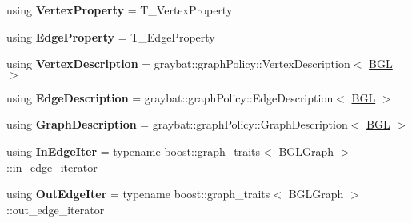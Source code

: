\begin{DoxyCompactItemize}
\item 
\hypertarget{classgraybat_1_1graphPolicy_1_1BGL_a265ad5af8b806b224bb7279bda3193c7}{}using {\bfseries Vertex\+Property} = T\+\_\+\+Vertex\+Property\label{classgraybat_1_1graphPolicy_1_1BGL_a265ad5af8b806b224bb7279bda3193c7}

\item 
\hypertarget{classgraybat_1_1graphPolicy_1_1BGL_ab914ee8a3223cc86c73af3046bf417cf}{}using {\bfseries Edge\+Property} = T\+\_\+\+Edge\+Property\label{classgraybat_1_1graphPolicy_1_1BGL_ab914ee8a3223cc86c73af3046bf417cf}

\item 
\hypertarget{classgraybat_1_1graphPolicy_1_1BGL_ae9fc60048660948bfc2418ed74cd3882}{}using {\bfseries Vertex\+Description} = graybat\+::graph\+Policy\+::\+Vertex\+Description$<$ \hyperlink{classgraybat_1_1graphPolicy_1_1BGL}{B\+G\+L} $>$\label{classgraybat_1_1graphPolicy_1_1BGL_ae9fc60048660948bfc2418ed74cd3882}

\item 
\hypertarget{classgraybat_1_1graphPolicy_1_1BGL_a72d9bad73b4ba1021b384379638b8e1e}{}using {\bfseries Edge\+Description} = graybat\+::graph\+Policy\+::\+Edge\+Description$<$ \hyperlink{classgraybat_1_1graphPolicy_1_1BGL}{B\+G\+L} $>$\label{classgraybat_1_1graphPolicy_1_1BGL_a72d9bad73b4ba1021b384379638b8e1e}

\item 
\hypertarget{classgraybat_1_1graphPolicy_1_1BGL_ab58617e8a5ce35716fa72c6c8ecee583}{}using {\bfseries Graph\+Description} = graybat\+::graph\+Policy\+::\+Graph\+Description$<$ \hyperlink{classgraybat_1_1graphPolicy_1_1BGL}{B\+G\+L} $>$\label{classgraybat_1_1graphPolicy_1_1BGL_ab58617e8a5ce35716fa72c6c8ecee583}

\item 
\hypertarget{classgraybat_1_1graphPolicy_1_1BGL_a29fc9b001ea3fc7288b710296de29e1c}{}using {\bfseries In\+Edge\+Iter} = typename boost\+::graph\+\_\+traits$<$ B\+G\+L\+Graph $>$\+::in\+\_\+edge\+\_\+iterator\label{classgraybat_1_1graphPolicy_1_1BGL_a29fc9b001ea3fc7288b710296de29e1c}

\item 
\hypertarget{classgraybat_1_1graphPolicy_1_1BGL_a275a43ac191b7f9bf5015b29bea4840e}{}using {\bfseries Out\+Edge\+Iter} = typename boost\+::graph\+\_\+traits$<$ B\+G\+L\+Graph $>$\+::out\+\_\+edge\+\_\+iterator\label{classgraybat_1_1graphPolicy_1_1BGL_a275a43ac191b7f9bf5015b29bea4840e}


\end{DoxyCompactItemize}
